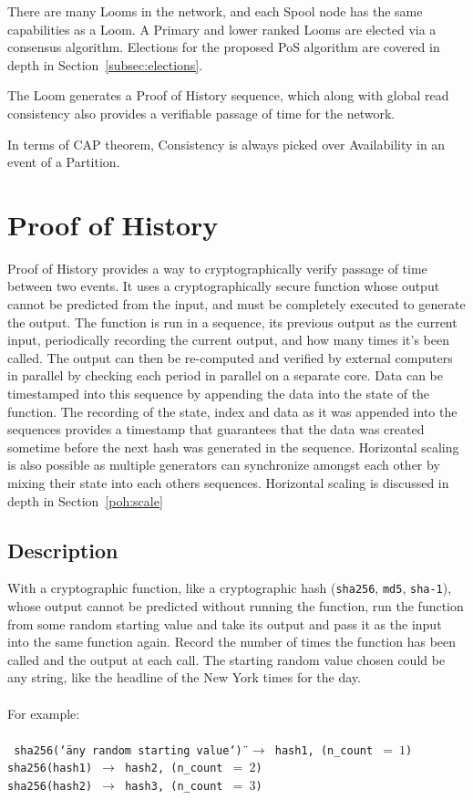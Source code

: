 \documentclass[12pt]{article}
\begin{document}
There are many Looms in the network, and each Spool node has the same capabilities as a Loom.  A Primary and lower ranked Looms are elected via a consensus algorithm. Elections for the proposed PoS algorithm are covered in depth in Section~\ref{subsec:elections}.

The Loom generates a Proof of History sequence, which along with global read consistency also provides a verifiable passage of time for the network.

In terms of CAP theorem, Consistency is always picked over Availability in an event of a Partition.

\section{Proof of History}\label{proof_of_history}

Proof of History provides a way to cryptographically verify passage of time between two events. It uses a cryptographically secure function whose output cannot be predicted from the input, and must be completely executed to generate the output. The function is run in a sequence, its previous output as the current input, periodically recording the current output, and how many times it's been called. The output can then be re-computed and verified by external computers in parallel by checking each period in parallel on a separate core. Data can be timestamped into this sequence by appending the data into the state of the function.  The recording of the state, index and data as it was appended into the sequences provides a timestamp that guarantees that the data was created sometime before the next hash was generated in the sequence. Horizontal scaling is also possible as multiple generators can synchronize amongst each other by mixing their state into each others sequences.  Horizontal scaling is discussed in depth in Section~\ref{poh:scale}\\

\subsection{Description}
With a cryptographic function, like a cryptographic hash (\texttt{sha256}, \texttt{md5}, \texttt{sha-1}), whose output cannot be predicted without running the function, run the function from some random starting value and take its output and pass it as the input into the same function again. Record the number of times the function has been called and the output at each call. The starting random value chosen could be any string, like the headline of the New York times for the day.
\\\\
\noindent For example: \\\\\noindent
\texttt{
  sha256(\char`\"any random starting value\char`\") $\rightarrow$
  hash1, (n\_count~$=~1$) \\
  sha256(hash1) $\rightarrow$ hash2, (n\_count~$=~2$)\\
  sha256(hash2) $\rightarrow$ hash3, (n\_count~$=~3$)\\
}
\end{document}
